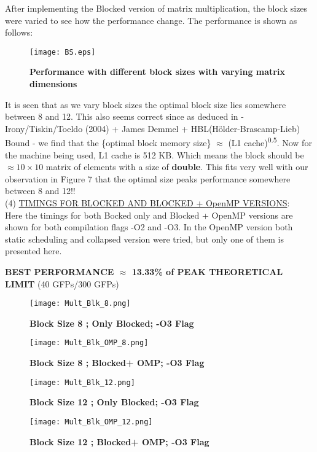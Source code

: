 \documentclass{article}
\begin{document}
\noindent After implementing the Blocked version of matrix multiplication, the block sizes were varied to see how the performance change. The performance is shown as follows:
 \begin{figure}[htpb!]
     \centering
    \texttt{[image: BS.eps]}
    \caption{ \textbf{Performance with different block sizes with varying matrix dimensions }}
    \end{figure}

\noindent It is seen that as we vary block sizes the optimal block size lies somewhere between 8 and 12. This also seems correct since as deduced in - Irony/Tiskin/Toeldo (2004) + James Demmel + HBL(Hölder-Brascamp-Lieb) Bound - we find that the \{optimal block memory size\} $\approx$ (L1 cache)\textsuperscript{0.5}. Now for the machine being used, L1 cache is 512 KB. Which means the block should be $\approx 10 \times 10 $ matrix of elements with a size of \textbf{double}. This fits very well with our observation in Figure 7 that the optimal size peaks performance somewhere between 8 and 12!! \\

\noindent (4) \underline{TIMINGS FOR BLOCKED AND BLOCKED + OpenMP VERSIONS}:\\
\noindent Here the timings for both Bocked only and Blocked + OpenMP versions are shown for both compilation flags -O2 and -O3. In the OpenMP version both static scheduling and collapsed version were tried, but only one of them is presented here.

\noindent \textbf{BEST PERFORMANCE $\approx$ 13.33\% of PEAK THEORETICAL LIMIT } (40 GFPs/300 GFPs) 

\newpage

\begin{figure}[htpb!]
     \centering

    \texttt{[image: Mult\_Blk\_8.png]}
    \caption{ \textbf{Block Size 8 ; Only Blocked; -O3 Flag}}

        \texttt{[image: Mult\_Blk\_OMP\_8.png]}
    \caption{ \textbf{Block Size 8 ; Blocked+ OMP; -O3 Flag}}
  \end{figure} 

\newpage

\begin{figure}[htpb!]
     \centering

    \texttt{[image: Mult\_Blk\_12.png]}
    \caption{ \textbf{Block Size 12 ; Only Blocked; -O3 Flag}}

        \texttt{[image: Mult\_Blk\_OMP\_12.png]}
    \caption{ \textbf{Block Size 12 ; Blocked+ OMP; -O3 Flag}}
  \end{figure} 
\end{document}
